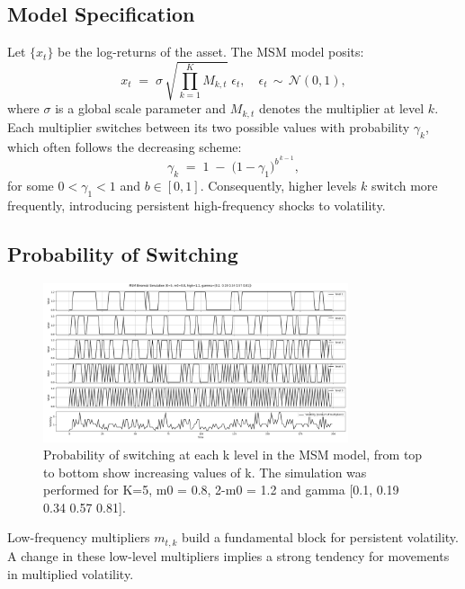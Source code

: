 \documentclass[11pt]{extarticle}
\begin{document}
\subsection{Model Specification}
Let $\{ x_t \}$ be the log-returns of the asset. The MSM model posits:
\begin{equation}
    x_t \;=\; \sigma \,\sqrt{\prod_{k=1}^K M_{k,t}} \;\epsilon_t,\quad
    \epsilon_t \,\sim\, \mathcal{N}(0,1),
\end{equation}
where $\sigma$ is a global scale parameter and $M_{k,t}$ denotes the multiplier at level $k$. Each multiplier switches between its two possible values with probability $\gamma_k$, which often follows the decreasing scheme:
\begin{equation}
    \label{eq:gamma_k}
    \gamma_k \;=\; 1 \;-\; \bigl(1 - \gamma_1\bigr)^{b^{\,k-1}},
\end{equation}
for some $0 < \gamma_1 < 1$ and $b \in  [0,1]$. Consequently, higher levels $k$ switch more frequently, introducing persistent high-frequency shocks to volatility.


\subsection{Probability of Switching}

\begin{figure}[!ht]
    \centering
    \includegraphics[width=0.8\textwidth]{img/k_analysis}
    \caption{Probability of switching at each k level in the MSM model, from top to bottom show increasing values of k.
    The simulation was performed for K=5, m0 = 0.8, 2-m0 = 1.2 and gamma [0.1, 0.19 0.34 0.57 0.81].}
    \label{fig:k_analysis}
\end{figure}

\FloatBarrier

Low-frequency multipliers $m_{t,k}$ build a fundamental block for persistent volatility.
A change in these low-level multipliers implies a strong tendency for movements in multiplied volatility.
\end{document}

